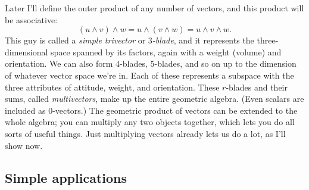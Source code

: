 \documentclass{utarticle}
\DeclareMathOperator{\out}{\wedge}
\begin{document}
Later I'll define the outer product of any number of vectors, and 
this product will be associative:
\begin{equation} 
(u \out v) \out w = u \out (v \out w) = u \out v \out w.
\end{equation}
This guy is called a \emph{simple trivector} or \emph{$3$-blade}, and it represents 
the three-dimensional space spanned by its factors, again with a weight (volume) 
and orientation.  We can also form $4$-blades, $5$-blades, and so on up to the 
dimension of whatever vector space we're in.  Each of these represents a subspace 
with the three attributes of attitude, weight, and orientation.  These $r$-blades and 
their sums, called \emph{multivectors}, make up the entire geometric algebra.  
(Even scalars are included as $0$-vectors.)  The geometric product 
of vectors can be extended to the whole algebra; you can multiply any two objects 
together, which lets you do all sorts of useful things.  Just multiplying vectors already 
lets us do a lot, as I'll show now.

\subsection{Simple applications}
\label{simpleapps}
\end{document}
